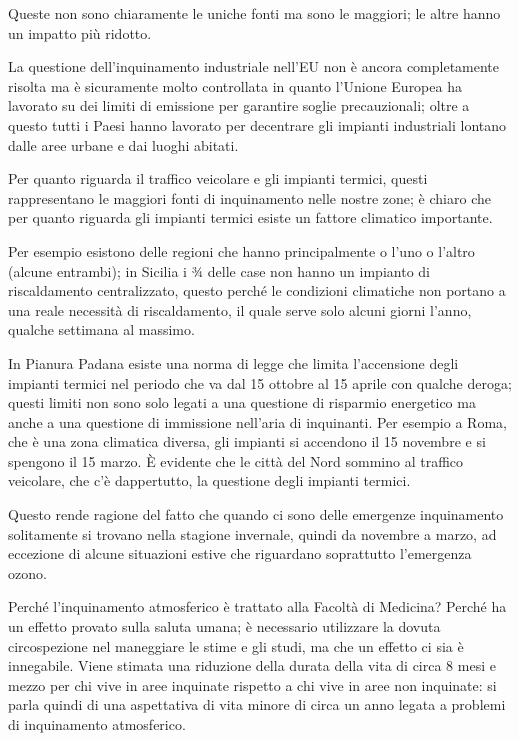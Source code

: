 \documentclass[]{article}
\begin{document}
Queste non sono chiaramente le uniche fonti ma sono le maggiori; le
altre hanno un impatto più ridotto.

La questione dell'inquinamento industriale nell'EU non è ancora
completamente risolta ma è sicuramente molto controllata in quanto
l'Unione Europea ha lavorato su dei limiti di emissione per garantire
soglie precauzionali; oltre a questo tutti i Paesi hanno lavorato per
decentrare gli impianti industriali lontano dalle aree urbane e dai
luoghi abitati.

Per quanto riguarda il traffico veicolare e gli impianti termici, questi
rappresentano le maggiori fonti di inquinamento nelle nostre zone; è
chiaro che per quanto riguarda gli impianti termici esiste un fattore
climatico importante.

Per esempio esistono delle regioni che hanno principalmente o l'uno o
l'altro (alcune entrambi); in Sicilia i ¾ delle case non hanno un
impianto di riscaldamento centralizzato, questo perché le condizioni
climatiche non portano a una reale necessità di riscaldamento, il quale
serve solo alcuni giorni l'anno, qualche settimana al massimo.

In Pianura Padana esiste una norma di legge che limita l'accensione
degli impianti termici nel periodo che va dal 15 ottobre al 15 aprile
con qualche deroga; questi limiti non sono solo legati a una questione
di risparmio energetico ma anche a una questione di immissione nell'aria
di inquinanti. Per esempio a Roma, che è una zona climatica diversa, gli
impianti si accendono il 15 novembre e si spengono il 15 marzo. È
evidente che le città del Nord sommino al traffico veicolare, che c'è
dappertutto, la questione degli impianti termici.

Questo rende ragione del fatto che quando ci sono delle emergenze
inquinamento solitamente si trovano nella stagione invernale, quindi da
novembre a marzo, ad eccezione di alcune situazioni estive che
riguardano soprattutto l'emergenza ozono.

Perché l'inquinamento atmosferico è trattato alla Facoltà di Medicina?
Perché ha un effetto provato sulla saluta umana; è necessario utilizzare
la dovuta circospezione nel maneggiare le stime e gli studi, ma che un
effetto ci sia è innegabile. Viene stimata una riduzione della durata
della vita di circa 8 mesi e mezzo per chi vive in aree inquinate
rispetto a chi vive in aree non inquinate: si parla quindi di una
aspettativa di vita minore di circa un anno legata a problemi di
inquinamento atmosferico.
\end{document}
